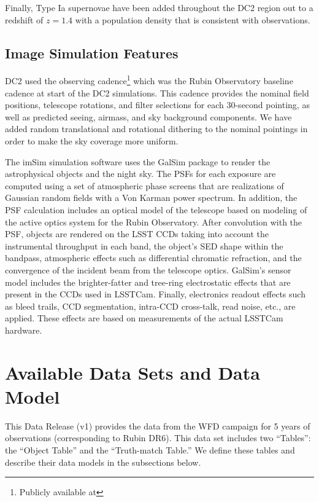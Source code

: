 \documentclass[11pt]{report}
\begin{document}
Finally, Type Ia supernovae have been added throughout the DC2 region out to a redshift of $z=1.4$ with a population density that is consistent with observations.

\subsection{Image Simulation Features}

DC2 used the  observing cadence\footnote{Publicly available at } which was the Rubin Observatory baseline cadence at start of the DC2 simulations. This cadence provides the nominal field positions, telescope rotations, and filter selections for each 30-second pointing, as well as predicted seeing, airmass, and sky background components.  We have added random translational and rotational dithering to the nominal pointings in order to make the sky coverage more uniform.

The imSim simulation software uses the GalSim package \citep{2015A&C....10..121R} to render the astrophysical objects and the night sky.  The PSFs for each exposure are computed using a set of atmospheric phase screens that are realizations of Gaussian random fields with a Von Karman power spectrum.  In addition, the PSF calculation includes an optical model of the telescope based on modeling of the active optics system for the Rubin Observatory.  After convolution with the PSF, objects are rendered on the LSST CCDs taking into account the instrumental throughput in each band, the object's SED shape within the bandpass, atmospheric effects such as differential chromatic refraction, and the convergence of the incident beam from the telescope optics. GalSim's sensor model includes the brighter-fatter and tree-ring electrostatic effects that are present in the CCDs used in LSSTCam.  Finally, electronics readout effects such as bleed trails, CCD segmentation, intra-CCD cross-talk, read noise, etc., are applied.  These effects are based on measurements of the actual LSSTCam hardware.


\section{Available Data Sets and Data Model}
\label{sec:products}

This Data Release (v1) provides the data from the WFD campaign for 5 years of observations (corresponding to Rubin DR6). This data set includes two ``Tables'': the ``Object Table'' and the ``Truth-match Table.'' We define these tables and describe their data models in the subsections below. 
\end{document}
